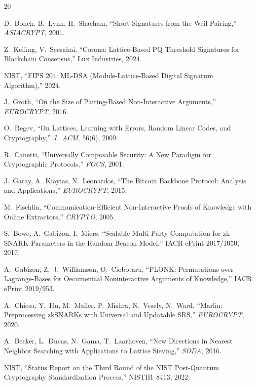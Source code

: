 \documentclass[11pt]{article}
\begin{document}
\begin{thebibliography}{20}

 D.~Boneh, B.~Lynn, H.~Shacham, ``Short
  Signatures from the Weil Pairing,'' \emph{ASIACRYPT}, 2001.

 Z.~Kelling, V.~Seesahai, ``Corona: Lattice-Based
  PQ Threshold Signatures for Blockchain Consensus,''
  Lux Industries, 2024.

 NIST, ``FIPS 204: ML-DSA (Module-Lattice-Based
  Digital Signature Algorithm),'' 2024.

 J.~Groth, ``On the Size of Pairing-Based
  Non-Interactive Arguments,'' \emph{EUROCRYPT}, 2016.

 O.~Regev, ``On Lattices, Learning with Errors,
  Random Linear Codes, and Cryptography,'' \emph{J.~ACM}, 56(6), 2009.

 R.~Canetti, ``Universally Composable Security:
  A New Paradigm for Cryptographic Protocols,'' \emph{FOCS}, 2001.

 J.~Garay, A.~Kiayias, N.~Leonardos, ``The Bitcoin
  Backbone Protocol: Analysis and Applications,'' \emph{EUROCRYPT},
  2015.

 M.~Fischlin, ``Communication-Efficient
  Non-Interactive Proofs of Knowledge with Online Extractors,''
  \emph{CRYPTO}, 2005.

 S.~Bowe, A.~Gabizon, I.~Miers, ``Scalable
  Multi-Party Computation for zk-SNARK Parameters in the Random Beacon
  Model,'' IACR ePrint 2017/1050, 2017.

 A.~Gabizon, Z.~J.~Williamson, O.~Ciobotaru,
  ``PLONK: Permutations over Lagrange-Bases for Oecumenical
  Noninteractive Arguments of Knowledge,'' IACR ePrint 2019/953.

 A.~Chiesa, Y.~Hu, M.~Maller, P.~Mishra,
  N.~Vesely, N.~Ward, ``Marlin: Preprocessing zkSNARKs with Universal
  and Updatable SRS,'' \emph{EUROCRYPT}, 2020.

 A.~Becker, L.~Ducas, N.~Gama, T.~Laarhoven,
  ``New Directions in Nearest Neighbor Searching with Applications to
  Lattice Sieving,'' \emph{SODA}, 2016.

 NIST, ``Status Report on the Third Round of
  the NIST Post-Quantum Cryptography Standardization Process,''
  NISTIR~8413, 2022.


\end{thebibliography}
\end{document}
